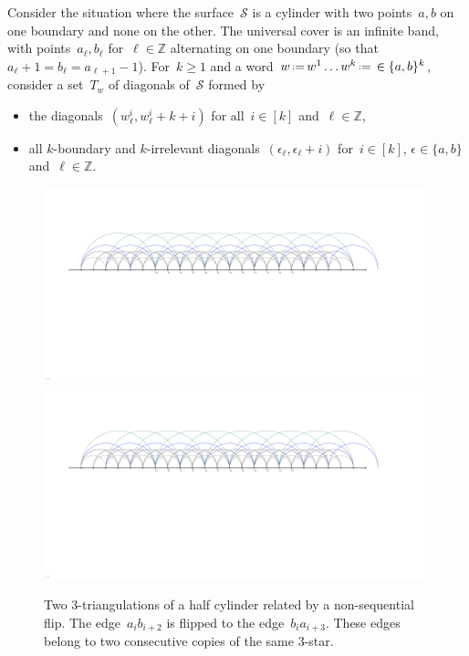 \documentclass{amsart}
\theoremstyle{remark}
\newcommand{\Z}{\mathbb{Z}} %
\newcommand{\eqdef}{\mbox{\,\raisebox{0.2ex}{\scriptsize\ensuremath{\mathrm:}}\ensuremath{=}\,}} %
\newcommand{\surface}{\mathcal{S}}
\begin{document}
Consider the situation where the surface~$\surface$ is a cylinder with two points~$a,b$ on one boundary and none on the other.
The universal cover is an infinite band, with points~$a_{\ell}, b_{\ell}$ for~$\ell \in \Z$ alternating on one boundary (so that~$a_\ell+1 = b_\ell = a_{\ell+1}-1$).
For~$k \ge 1$ and a word~$w \eqdef w^1 \dots w^k \eqdef  \in \{a,b\}^k$, consider a set~$T_w$ of diagonals of~$\surface$ formed by
\begin{itemize}
\item the diagonals~$(w^i_\ell, w^i_{\ell}+k+i)$ for all~$i \in [k]$ and~$\ell \in \Z$,
\item all $k$-boundary and $k$-irrelevant diagonals~$(\epsilon_{\ell}, \epsilon_{\ell}+i)$ for~$i \in [k]$, $\epsilon \in \{a,b\}$ and~$\ell \in \Z$.
\end{itemize}

\begin{figure}
	\capstart
	\includegraphics[page=2, scale=.5, clip, trim=15cm 0cm 17cm 0cm]{FNSk3p2} \\[.5cm]
	\includegraphics[page=3, scale=.5, clip, trim=15cm 0cm 17cm 0cm]{FNSk3p2}
	\caption{Two $3$-triangulations of a half cylinder related by a non-sequential flip. The edge~$a_ib_{i+2}$ is flipped to the edge~$b_ia_{i+3}$. These edges belong to two consecutive copies of the same $3$-star.}
	\label{fig:nonsequential}
\end{figure}
\end{document}
